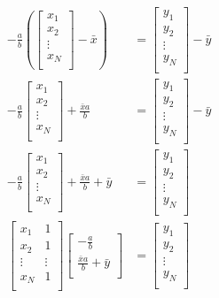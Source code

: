 \documentclass{article}
\begin{document}
\begin{align*}
-\frac{a}{b} (\begin{bmatrix}
x_1 \\
x_2 \\
\vdots \\
x_N \\
\end{bmatrix} - \bar{x})&= \begin{bmatrix}
y_1 \\
y_2 \\
\vdots \\
y_N \\
\end{bmatrix} - \bar{y} \\
-\frac{a}{b} \begin{bmatrix}
x_1 \\
x_2 \\
\vdots \\
x_N \\
\end{bmatrix} + \frac{\bar{x} a}{b} &= \begin{bmatrix}
y_1 \\
y_2 \\
\vdots \\
y_N \\
\end{bmatrix} - \bar{y} \\
-\frac{a}{b} \begin{bmatrix}
x_1 \\
x_2 \\
\vdots \\
x_N \\
\end{bmatrix} + \frac{\bar{x} a}{b} + \bar{y} &= \begin{bmatrix}
y_1 \\
y_2 \\
\vdots \\
y_N \\
\end{bmatrix} \\
\begin{bmatrix}
x_1 & 1 \\
x_2 & 1 \\
\vdots & \vdots \\
x_N & 1 \\
\end{bmatrix} \begin{bmatrix}
-\frac{a}{b} \\
\frac{\bar{x} a}{b} + \bar{y} \\
\end{bmatrix} &= \begin{bmatrix}
y_1 \\
y_2 \\
\vdots \\
y_N \\
\end{bmatrix} \\
\end{align*}
\end{document}

